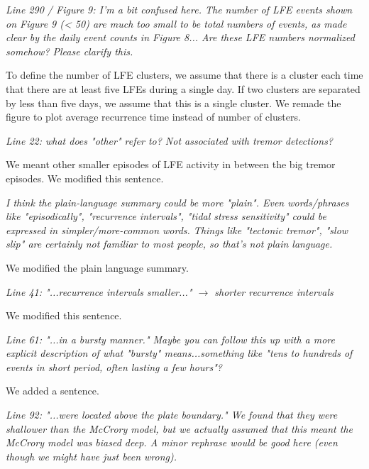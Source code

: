 \documentclass[letterpaper, 12pt]{article}
\begin{document}
\bigskip

\textit{Line 290 / Figure 9: I'm a bit confused here. The number of LFE events shown on Figure 9 (< 50) are much too small to be total numbers of events, as made clear by the daily event counts in Figure 8... Are these LFE numbers normalized somehow? Please clarify this.} 

\bigskip

To define the number of LFE clusters, we assume that there is a cluster each time that there are at least five LFEs during a single day. If two clusters are separated by less than five days, we assume that this is a single cluster. We remade the figure to plot average recurrence time instead of number of clusters.

\bigskip

\textit{Line 22: what does "other" refer to? Not associated with tremor detections?}

\bigskip

We meant other smaller episodes of LFE activity in between the big tremor episodes. We modified this sentence.

\bigskip

\textit{I think the plain-language summary could be more "plain". Even words/phrases like "episodically", "recurrence intervals", "tidal stress sensitivity" could be expressed in  simpler/more-common words. Things like "tectonic tremor", "slow slip" are certainly not familiar to most people, so that's not plain language.}

\bigskip

We modified the plain language summary.

\bigskip

\textit{Line 41: "...recurrence intervals smaller..." $\rightarrow$ shorter recurrence intervals}

\bigskip

We modified this sentence.

\bigskip

\textit{Line 61: "...in a bursty manner." Maybe you can follow this up with a more explicit description of what "bursty" means...something like "tens to hundreds of events in short period, often lasting a few hours"?}

\bigskip

We added a sentence.

\bigskip

\textit{Line 92: "...were located above the plate boundary." We found that they were shallower than the McCrory model, but we actually assumed that this meant the McCrory model was biased deep. A minor rephrase would be good here (even though we might have just been wrong).}
\end{document}
